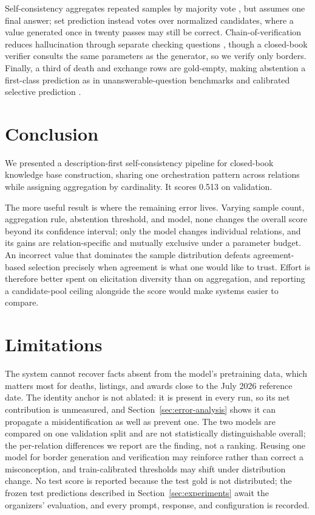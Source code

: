 \documentclass[11pt]{article}
\begin{document}
Self-consistency aggregates repeated samples by majority vote
\citep{wang2023selfconsistency}, but assumes one final answer; set prediction
instead votes over normalized candidates, where a value generated once in twenty
passes may still be correct. Chain-of-verification reduces hallucination through
separate checking questions \citep{dhuliawala2024cove}, though a closed-book
verifier consults the same parameters as the generator, so we verify only
borders. Finally, a third of death and exchange rows are gold-empty, making
abstention a first-class prediction as in unanswerable-question benchmarks
\citep{rajpurkar2018squad2} and calibrated selective prediction
\citep{kamath2020selective}.

\section{Conclusion}
\label{sec:conclusion}

We presented a description-first self-consistency pipeline for closed-book
knowledge base construction, sharing one orchestration pattern across relations
while assigning aggregation by cardinality. It scores 0.513 on validation.

The more useful result is where the remaining error lives. Varying sample count,
aggregation rule, abstention threshold, and model, none changes the overall
score beyond its confidence interval; only the model changes individual
relations, and its gains are relation-specific and mutually exclusive under a
parameter budget. An incorrect value that dominates the sample distribution
defeats agreement-based selection precisely when agreement is what one would
like to trust. Effort is therefore better spent on elicitation diversity than on
aggregation, and reporting a candidate-pool ceiling alongside the score would
make systems easier to compare.

\section*{Limitations}

The system cannot recover facts absent from the model's pretraining data,
which matters most for deaths, listings, and awards close to the July 2026
reference date. The identity anchor is not ablated: it is present in every
run, so its net contribution is unmeasured, and Section~\ref{sec:error-analysis}
shows it can propagate a misidentification as well as prevent one. The two
models are compared on one validation split and are not statistically
distinguishable overall; the per-relation differences we report are the
finding, not a ranking. Reusing one model for border generation and
verification may reinforce rather than correct a misconception, and
train-calibrated thresholds may shift under distribution change. No test
score is reported because the test gold is not distributed; the frozen test
predictions described in Section~\ref{sec:experiments} await the organizers'
evaluation, and every prompt, response, and configuration is recorded.


\end{document}
